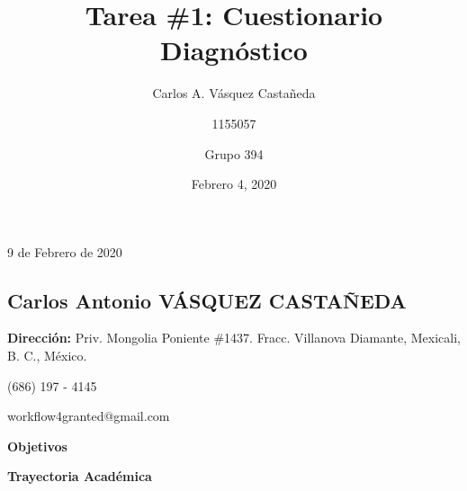 \documentclass[12pt, letterpaper]{article}
\title{Tarea \#1: Cuestionario Diagnóstico}
\author{Carlos A. Vásquez Castañeda \and 1155057 \and Grupo 394}
\date{Febrero 4, 2020}
\begin{document}


9 de Febrero de 2020
\begin{shaded}
\begin{center}
\section*{Carlos Antonio VÁSQUEZ CASTAÑEDA}
\end{center}
\end{shaded}
\textbf{Dirección:} Priv. Mongolia Poniente \#1437. Fracc. Villanova Diamante, Mexicali, B. C., México.

(686) 197 - 4145

workflow4granted@gmail.com

\textbf{Objetivos}
\begin{shaded}
\textbf{Trayectoria Académica}
\end{shaded}
\renewcommand\refname{References}
\printbibliography
\end{document}
